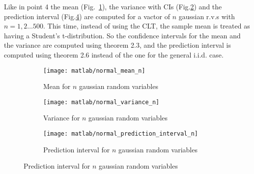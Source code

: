 \documentclass{article}
\begin{document}
Like in point 4 the mean (Fig.~\ref{gaussian_mean_n}), the variance
with CIs (Fig.\ref{gaussian_var_n}) and the prediction interval
(Fig.\ref{gaussian_pred_int_n}) are computed for a vactor of $n$
gaussian r.v.s with $n = 1,2\dots500$. This time, instead of using the
CLT, the sample mean is treated as having a Student's
t-distribution. So the confidence intervals for the mean and the
variance are computed using theorem 2.3, and the prediction interval
is computed using theorem 2.6 instead of the one for the general
i.i.d. case.
\begin{figure}[htbp]
  \centering
  \begin{subfigure}{.5\textwidth}
    \centering
    \texttt{[image: matlab/normal\_mean\_n]}
    \caption{Mean for $n$ gaussian random variables}
    \label{gaussian_mean_n}
  \end{subfigure}%
  \begin{subfigure}{.5\textwidth}
    \centering
    \texttt{[image: matlab/normal\_variance\_n]}
    \caption{Variance for $n$ gaussian random variables}
    \label{gaussian_var_n}
  \end{subfigure}
  \begin{subfigure}{.5\textwidth}
    \centering
    \texttt{[image: matlab/normal\_prediction\_interval\_n]}
    \caption{Prediction interval for $n$ gaussian random variables}
    \label{gaussian_pred_int_n}
  \end{subfigure}
\end{figure}
\end{document}

